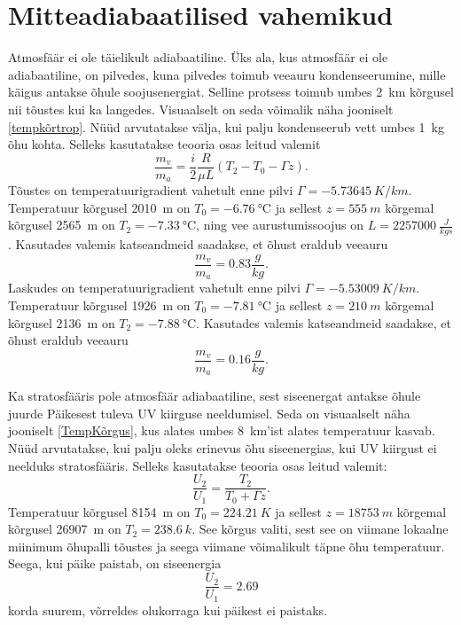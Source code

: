 \documentclass{trkut}%
\begin{document}
\section{Mitteadiabaatilised vahemikud}
Atmosfäär ei ole täielikult adiabaatiline. Üks ala, kus atmosfäär ei ole adiabaatiline, on pilvedes, kuna pilvedes toimub veeauru kondenseerumine, mille käigus antakse õhule soojusenergiat. Selline protsess toimub umbes \SI{2}{km} kõrgusel nii tõustes kui ka langedes. Visuaalselt on seda võimalik näha jooniselt \ref{tempkõrtrop}. Nüüd arvutatakse välja, kui palju kondenseerub vett umbes \SI{1}{kg} õhu kohta. Selleks kasutatakse teooria osas leitud valemit
\begin{equation*}
\frac{m_v}{m_a} = \frac{i}{2}\frac{R}{\mu L}\left(T_2- T_0 - \Gamma z\right).
\end{equation*}
Tõustes on temperatuurigradient vahetult enne pilvi $\Gamma = \SI{-5.73645}{K/km}$. Temperatuur kõrgusel \SI{2010}{m} on $T_0 = \SI{-6.76}{\degreeCelsius}$ ja sellest $z = \SI{555}{m}$ kõrgemal kõrgusel \SI{2565}{m} on $T_2 = \SI{-7.33}{\degreeCelsius}$, ning vee aurustumissoojus on $L = \SI{2257000}{\frac{J}{kgs}}$. Kasutades valemis katseandmeid saadakse, et õhust eraldub veeauru
\begin{equation*}
\frac{m_v}{m_a} = 0.83 \frac{g}{kg}.
\end{equation*}
Laskudes on temperatuurigradient vahetult enne pilvi $\Gamma = \SI{-5.53009}{K/km}$. Temperatuur kõrgusel \SI{1926}{m} on $T_0 = \SI{-7.81}{\degreeCelsius}$ ja sellest $z = \SI{210}{m}$ kõrgemal kõrgusel \SI{2136}{m} on $T_2 = \SI{-7.88}{\degreeCelsius}$. Kasutades valemis katseandmeid saadakse, et õhust eraldub veeauru
\begin{equation*}
\frac{m_v}{m_a} = 0.16 \frac{g}{kg}.
\end{equation*}

Ka stratosfääris pole atmosfäär adiabaatiline, sest siseenergat antakse õhule juurde Päikesest tuleva UV kiirguse neeldumisel. Seda on visuaalselt näha jooniselt \ref{TempKõrgus}, kus alates umbes \SI{8}{km}'ist alates temperatuur kasvab. Nüüd arvutatakse, kui palju oleks erinevus õhu siseenergias, kui UV kiirgust ei neelduks stratosfääris. Selleks kasutatakse teooria osas leitud valemit:
\begin{equation*}
\frac{U_2}{U_1} = \frac{T_2}{T_0+\Gamma z}.
\end{equation*}
Temperatuur kõrgusel \SI{8154}{m} on $T_0 = \SI{224.21}{K}$ ja sellest $z = \SI{18753}{m}$ kõrgemal kõrgusel \SI{26907}{m} on $T_2 = \SI{238.6}{k}$. See kõrgus valiti, sest see on viimane lokaalne miinimum õhupalli tõustes ja seega viimane võimalikult täpne õhu temperatuur. Seega, kui päike paistab, on siseenergia 
\begin{equation*}
\frac{U_2}{U_1} = 2.69
\end{equation*}
korda suurem, võrreldes olukorraga kui päikest ei paistaks.
\end{document}
